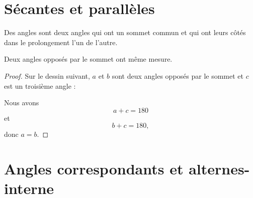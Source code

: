 

\section{Sécantes et parallèles}



\begin{definition}
    Des angles  sont deux angles qui ont un sommet commun et qui ont leurs côtés dans le prolongement l'un de l'autre.
\end{definition}

\begin{propriete}
    Deux angles opposés par le sommet ont même mesure.

\begin{center}
   
\end{center}


\end{propriete}

\begin{proof}
    Sur le dessin suivant, \( a\) et \(b\) sont deux angles opposés par le sommet et \( c\) est un troisième angle :

\begin{center}
    
\end{center}

Nous avons
\begin{equation}
    a+c=180
\end{equation}
et
\begin{equation}
    b+c=180,
\end{equation}
donc \( a=b\).

\end{proof}

\section{Angles correspondants et alternes-interne}

